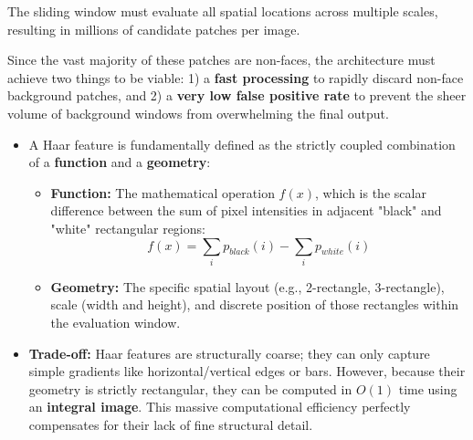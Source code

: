 
{
The sliding window must evaluate all spatial locations across multiple scales, resulting in millions of candidate patches per image.

Since the vast majority of these patches are non-faces, the architecture must achieve two things to be viable: 1) a \textbf{fast processing} to rapidly discard non-face background patches, and 2) a \textbf{very low false positive rate} to prevent the sheer volume of background windows from overwhelming the final output.
}

{
\begin{itemize}
    \item A Haar feature is fundamentally defined as the strictly coupled combination of a \textbf{function} and a \textbf{geometry}:
    \begin{itemize}
        \item \textbf{Function:} The mathematical operation $f(x)$, which is the scalar difference between the sum of pixel intensities in adjacent "black" and "white" rectangular regions:
        $$f(x) = \sum_i p_{black}(i) - \sum_i p_{white}(i)$$
        \item \textbf{Geometry:} The specific spatial layout (e.g., 2-rectangle, 3-rectangle), scale (width and height), and discrete position of those rectangles within the evaluation window.
    \end{itemize}
    \item \textbf{Trade-off:} Haar features are structurally coarse; they can only capture simple gradients like horizontal/vertical edges or bars. However, because their geometry is strictly rectangular, they can be computed in $O(1)$ time using an \textbf{integral image}. This massive computational efficiency perfectly compensates for their lack of fine structural detail.
\end{itemize}}

